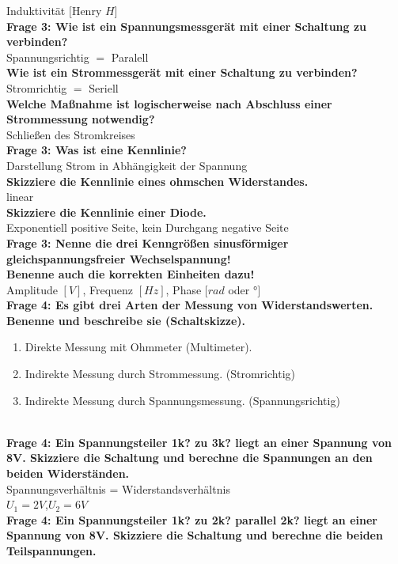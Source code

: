\documentclass[11pt,a4paper]{scrartcl}
\begin{document}
Induktivität $[$Henry $H]$\\
\textbf{Frage 3: Wie ist ein Spannungsmessgerät mit einer Schaltung zu verbinden?}\\
Spannungsrichtig $=$ Paralell\\
\textbf{Wie ist ein Strommessgerät mit einer Schaltung zu verbinden?}\\
Stromrichtig $=$ Seriell\\
\textbf{Welche Maßnahme ist logischerweise nach Abschluss einer Strommessung notwendig?}\\
Schließen des Stromkreises\\
\textbf{Frage 3: Was ist eine Kennlinie?}\\
Darstellung Strom in Abhängigkeit der Spannung\\
\textbf{Skizziere die Kennlinie eines ohmschen Widerstandes.}\\
linear\\
\textbf{Skizziere die Kennlinie einer Diode.}\\
Exponentiell positive Seite, kein Durchgang negative Seite\\
\textbf{Frage 3: Nenne die drei Kenngrößen sinusförmiger gleichspannungsfreier Wechselspannung!\\
Benenne auch die korrekten Einheiten dazu!}\\
Amplitude $[V]$, Frequenz $[Hz]$, Phase $[rad$ oder $°]$\\
\textbf{Frage 4: Es gibt drei Arten der Messung von Widerstandswerten. Benenne und beschreibe sie (Schaltskizze).}\\
\begin{enumerate}
	\item Direkte Messung mit Ohmmeter (Multimeter).
	\item Indirekte Messung durch Strommessung. (Stromrichtig)
	\item Indirekte Messung durch Spannungsmessung. (Spannungsrichtig)
\end{enumerate}\\
\textbf{Frage 4: Ein Spannungsteiler 1k? zu 3k? liegt an einer Spannung von 8V. Skizziere die Schaltung und berechne die Spannungen an den beiden Widerständen.}\\
Spannungsverhältnis = Widerstandsverhältnis\\
$U_1=2V$,$U_2=6V$\\
\textbf{Frage 4: Ein Spannungsteiler 1k? zu 2k? parallel 2k? liegt an einer Spannung von 8V. Skizziere die Schaltung und berechne die beiden Teilspannungen.}\\
\end{document}
